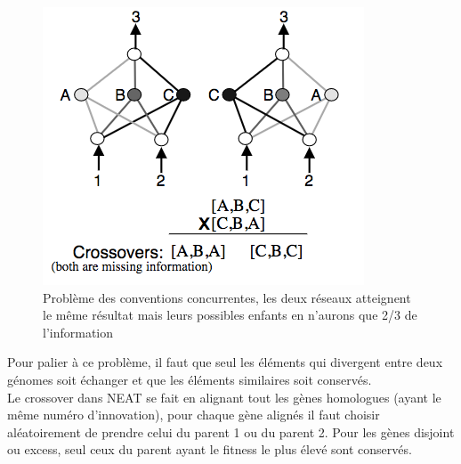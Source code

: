 \documentclass{article}
\begin{document}
\begin{figure}[H]
\begin{center}
	\includegraphics[scale=0.7]{competingconventions.png}
	\caption{Problème des conventions concurrentes, les deux réseaux atteignent le même résultat mais leurs possibles enfants en n'aurons que 2/3 de l'information \cite{neatpaper}}
\end{center}
\end{figure}

Pour palier à ce problème, il faut que seul les éléments qui divergent entre deux génomes soit échanger et que les éléments similaires soit conservés.\\

Le crossover dans NEAT se fait en alignant tout les gènes homologues (ayant le même numéro d'innovation), pour chaque gène alignés il faut choisir aléatoirement de prendre celui du parent 1 ou du parent 2. Pour les gènes disjoint ou excess, seul ceux du parent ayant le fitness le plus élevé sont conservés.
\end{document}

